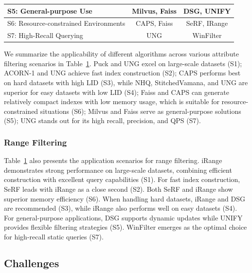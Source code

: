 \documentclass[sigconf, nonacm]{acmart}
\begin{document}
\begin{sloppypar}
\begin{table}[htbp]
{\begin{tabular}{|l|c|c|}
\hline
S5: General-purpose Use & Milvus, Faiss &DSG, UNIFY\\
\hline
S6: Resource-constrained Environments & CAPS, Faiss&SeRF, IRange \\
\hline
S7: High-Recall Querying & UNG & WinFilter \\
\hline
\end{tabular}
}
\label{tab:algo_scenarios}
\vspace{-0.3cm}
\end{table}


We summarize the applicability of different algorithms across various attribute filtering scenarios in Table~\ref{tab:algo_scenarios}.
Puck and UNG excel on large-scale datasets (S1); ACORN-1 and UNG achieve fast index construction (S2); CAPS performs best on hard datasets with high LID (S3), while NHQ, StitchedVamana, and UNG are superior for easy datasets with low LID (S4); Faiss and CAPS can generate relatively compact indexes with low memory usage, which is suitable for resource-constrained situations (S6); Milvus and Faiss serve as general-purpose solutions (S5); UNG stands out for its high recall, precision, and QPS (S7).

\subsubsection{\textbf{Range Filtering}}


Table~\ref{tab:algo_scenarios} also presents the application scenarios for range filtering. iRange demonstrates strong performance on large-scale datasets, combining efficient construction with excellent query capabilities (S1). For fast index construction, SeRF leads with iRange as a close second (S2). Both SeRF and iRange show superior memory efficiency (S6). When handling hard datasets, iRange and DSG are recommended (S3), while iRange also performs well on easy datasets (S4). For general-purpose applications, DSG supports dynamic updates while UNIFY provides flexible filtering strategies (S5). WinFilter emerges as the optimal choice for high-recall static queries (S7).




\subsection{Challenges}

\end{sloppypar}
\end{document}
